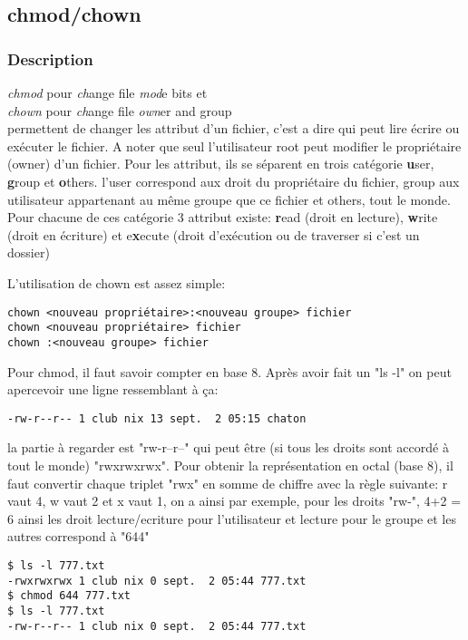 \subsection*{chmod/chown}
\subsubsection*{Description}
\noindent \emph{chmod} pour \emph{ch}ange file \emph{mod}e bits et\\
\emph{chown} pour  \emph{ch}ange file \emph{own}er and group\\
permettent de changer les attribut d'un fichier, c'est a dire qui peut lire écrire ou exécuter le fichier.
A noter que seul l'utilisateur root peut modifier le propriétaire (owner) d'un fichier.
Pour les attribut, ils se séparent en trois catégorie \textbf{u}ser, \textbf{g}roup et \textbf{o}thers.
l'user correspond aux droit du propriétaire du fichier, group aux utilisateur appartenant au même groupe que ce fichier et others, tout le monde.\\
Pour chacune de ces catégorie 3 attribut existe: \textbf{r}ead (droit en lecture), \textbf{w}rite (droit en écriture) et e\textbf{x}ecute (droit d’exécution ou de traverser si c'est un dossier)

\noindent L'utilisation de chown est assez simple:
\begin{lstlisting}
chown <nouveau propriétaire>:<nouveau groupe> fichier
chown <nouveau propriétaire> fichier
chown :<nouveau groupe> fichier
\end{lstlisting}

\noindent
Pour chmod, il faut savoir compter en base 8. Après avoir fait un "ls -l" on peut apercevoir une ligne ressemblant à ça:
\begin{lstlisting}
-rw-r--r-- 1 club nix 13 sept.  2 05:15 chaton
\end{lstlisting}
la partie à regarder est "rw-r--r--" qui peut être (si tous les droits sont accordé à tout le monde) "rwxrwxrwx".
Pour obtenir la représentation en octal (base 8), il faut convertir chaque triplet "rwx" en somme de chiffre avec la règle suivante:
r vaut 4, w vaut 2 et x vaut 1, on a ainsi par exemple, pour les droits "rw-", 4+2 = 6
ainsi les droit lecture/ecriture pour l'utilisateur et lecture pour le groupe et les autres correspond à "644"

\begin{lstlisting}
$ ls -l 777.txt
-rwxrwxrwx 1 club nix 0 sept.  2 05:44 777.txt
$ chmod 644 777.txt
$ ls -l 777.txt
-rw-r--r-- 1 club nix 0 sept.  2 05:44 777.txt
\end{lstlisting}

